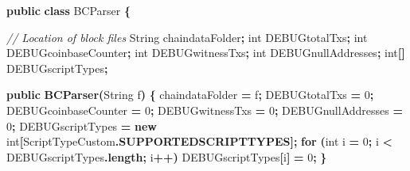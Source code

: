 \documentclass[
  italian,
  openany]{book}
\newenvironment{Shaded}{\begin{snugshade}}{\end{snugshade}}
\newcommand{\BuiltInTok}[1]{#1}
\newcommand{\CommentTok}[1]{\textcolor[rgb]{0.56,0.35,0.01}{\textit{#1}}}
\newcommand{\ControlFlowTok}[1]{\textcolor[rgb]{0.13,0.29,0.53}{\textbf{#1}}}
\newcommand{\DataTypeTok}[1]{\textcolor[rgb]{0.13,0.29,0.53}{#1}}
\newcommand{\DecValTok}[1]{\textcolor[rgb]{0.00,0.00,0.81}{#1}}
\newcommand{\FunctionTok}[1]{\textcolor[rgb]{0.13,0.29,0.53}{\textbf{#1}}}
\newcommand{\KeywordTok}[1]{\textcolor[rgb]{0.13,0.29,0.53}{\textbf{#1}}}
\newcommand{\NormalTok}[1]{#1}
\newcommand{\OperatorTok}[1]{\textcolor[rgb]{0.81,0.36,0.00}{\textbf{#1}}}
\begin{document}
\begin{Shaded}
\begin{Highlighting}[]
\KeywordTok{public} \KeywordTok{class}\NormalTok{ BCParser }\OperatorTok{\{}

    \CommentTok{// Location of block files}
    \BuiltInTok{String}\NormalTok{ chaindataFolder}\OperatorTok{;}
    \DataTypeTok{int}\NormalTok{ DEBUGtotalTxs}\OperatorTok{;}
    \DataTypeTok{int}\NormalTok{ DEBUGcoinbaseCounter}\OperatorTok{;}
    \DataTypeTok{int}\NormalTok{ DEBUGwitnessTxs}\OperatorTok{;}
    \DataTypeTok{int}\NormalTok{ DEBUGnullAddresses}\OperatorTok{;}
    \DataTypeTok{int}\OperatorTok{[]}\NormalTok{ DEBUGscriptTypes}\OperatorTok{;}

    \KeywordTok{public} \FunctionTok{BCParser}\OperatorTok{(}\BuiltInTok{String}\NormalTok{ f}\OperatorTok{)} \OperatorTok{\{}
\NormalTok{        chaindataFolder }\OperatorTok{=}\NormalTok{ f}\OperatorTok{;}
\NormalTok{        DEBUGtotalTxs }\OperatorTok{=} \DecValTok{0}\OperatorTok{;}
\NormalTok{        DEBUGcoinbaseCounter }\OperatorTok{=} \DecValTok{0}\OperatorTok{;}
\NormalTok{        DEBUGwitnessTxs }\OperatorTok{=} \DecValTok{0}\OperatorTok{;}
\NormalTok{        DEBUGnullAddresses }\OperatorTok{=} \DecValTok{0}\OperatorTok{;}
\NormalTok{        DEBUGscriptTypes }\OperatorTok{=} \KeywordTok{new} \DataTypeTok{int}\OperatorTok{[}\NormalTok{ScriptTypeCustom}\OperatorTok{.}\FunctionTok{SUPPORTEDSCRIPTTYPES}\OperatorTok{];}
        \ControlFlowTok{for} \OperatorTok{(}\DataTypeTok{int}\NormalTok{ i }\OperatorTok{=} \DecValTok{0}\OperatorTok{;}\NormalTok{ i }\OperatorTok{\textless{}}\NormalTok{ DEBUGscriptTypes}\OperatorTok{.}\FunctionTok{length}\OperatorTok{;}\NormalTok{ i}\OperatorTok{++)}
\NormalTok{            DEBUGscriptTypes}\OperatorTok{[}\NormalTok{i}\OperatorTok{]} \OperatorTok{=} \DecValTok{0}\OperatorTok{;}
    \OperatorTok{\}}


\end{Highlighting}
\end{Shaded}
\end{document}
